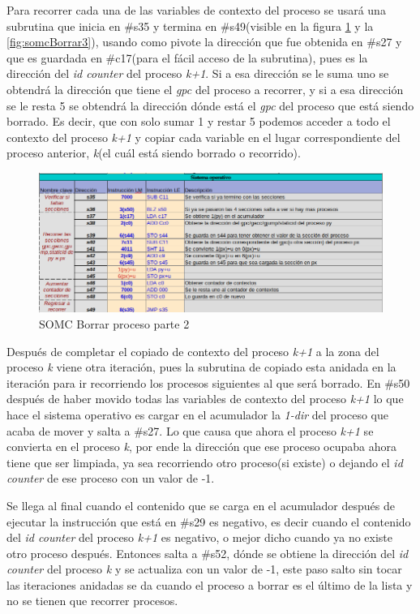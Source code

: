 \documentclass[letterpaper,12pt,oneside]{book}
\begin{document}
		Para recorrer cada una
		de las variables de contexto del proceso se usará una subrutina que 
		inicia en \#s35 y termina en \#s49(visible en la figura \ref{fig:somcBorrar2} y la \ref{fig:somcBorrar3}), usando como pivote la dirección que fue obtenida en \#s27 y que es guardada en
		\#c17(para el fácil acceso de la subrutina), pues es la dirección
		del \textit{id counter} del proceso \textit{k+1}. Si a esa dirección se le suma uno se obtendrá la dirección que tiene el \textit{gpc}
		del proceso a recorrer, y si a esa dirección se le resta 5 se obtendrá la dirección dónde está  el \textit{gpc} del proceso que está siendo 
		borrado. Es decir, que con solo sumar 1 y restar 5 podemos acceder a todo el contexto del proceso \textit{k+1} y copiar
		cada variable en el lugar correspondiente del proceso anterior, \textit{k}(el cuál está siendo
		borrado o recorrido).
		
		
		\begin{figure}[h]		
			\centering
			\includegraphics[scale=0.53]{media/CARDIACC/SO_Borrar2.png}
			\caption{ SOMC Borrar proceso parte 2}
			\label{fig:somcBorrar2}
		\end{figure}
		
		Después de completar el copiado de contexto del proceso \textit{k+1} a la zona del proceso \textit{k}
		viene otra iteración, pues la subrutina de copiado esta anidada en la iteración para
		ir recorriendo los procesos siguientes al que será borrado. En \#s50 después de haber movido todas las variables de contexto del proceso
		\textit{k+1} lo que hace el sistema operativo es cargar en el acumulador la \textit{1-dir} del proceso que acaba de mover y salta a \#s27. Lo 
		que 
		causa
		que ahora el proceso \textit{k+1} se convierta en el proceso \textit{k}, por ende 
		la dirección que ese proceso
		ocupaba ahora tiene que ser limpiada, ya sea recorriendo otro proceso(si existe) o dejando el \textit{id counter} de ese proceso
		con un valor de -1. 
		

		Se llega al final cuando el contenido que se carga en el acumulador después de ejecutar la instrucción que está en \#s29 es
		negativo, es decir cuando el contenido del \textit{id counter} del proceso \textit{k+1} es negativo, o mejor dicho
		cuando ya no existe otro proceso después. Entonces salta a \#s52, dónde se obtiene la dirección del \textit{id counter} del proceso \textit{k}
		y se actualiza con un valor de -1, este paso salto sin tocar las iteraciones anidadas se da cuando el proceso
		a borrar es el último de la lista y no se tienen que recorrer procesos. 
		
\end{document}
